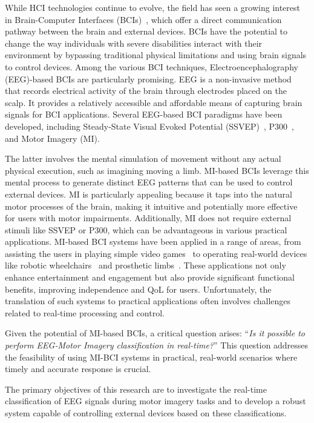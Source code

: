 While HCI technologies continue to evolve, the field has seen a growing interest in Brain-Computer Interfaces (BCIs)~\cite{yadav2020comprehensive}, which offer a direct communication pathway between the brain and external devices. 
BCIs have the potential to change the way individuals with severe disabilities interact with their environment by bypassing traditional physical limitations and using brain signals to control devices.
Among the various BCI techniques, Electroencephalography (EEG)-based BCIs are particularly promising. 
EEG is a non-invasive method that records electrical activity of the brain through electrodes placed on the scalp. 
It provides a relatively accessible and affordable means of capturing brain signals for BCI applications. 
Several EEG-based BCI paradigms have been developed, including Steady-State Visual Evoked Potential (SSVEP)~\cite{BCI_SSVEP_P300}, P300~\cite{BCI_SSVEP_P300}, and Motor Imagery (MI).

The latter involves the mental simulation of movement without any actual physical execution, such as imagining moving a limb. 
MI-based BCIs leverage this mental process to generate distinct EEG patterns that can be used to control external devices. 
MI is particularly appealing because it taps into the natural motor processes of the brain, making it intuitive and potentially more effective for users with motor impairments. 
Additionally, MI does not require external stimuli like SSVEP or P300, which can be advantageous in various practical applications.
MI-based BCI systems have been applied in a range of areas, from assisting the users in playing simple video games~\cite{10174453} to operating real-world devices like robotic wheelchairs~\cite{palumbo2021motor} and prosthetic limbs~\cite{10453986}.
These applications not only enhance entertainment and engagement but also provide significant functional benefits, improving independence and QoL for users.
Unfortunately, the translation of such systems to practical applications often involves challenges related to real-time processing and control.

Given the potential of MI-based BCIs, a critical question arises: ``\emph{Is it possible to perform EEG-Motor Imagery classification in real-time?}'' 
This question addresses the feasibility of using MI-BCI systems in practical, real-world scenarios where timely and accurate response is crucial.

The primary objectives of this research are to investigate the real-time classification of EEG signals during motor imagery tasks and to develop a robust system capable of controlling external devices based on these classifications. 

